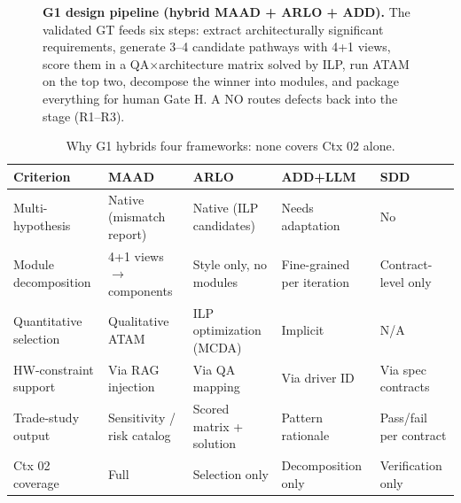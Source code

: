 \documentclass[11pt,a4paper]{article}
\begin{document}
\begin{figure}[htbp]
{}%
\caption{\textbf{G1 design pipeline (hybrid MAAD + ARLO + ADD).} The validated GT feeds
six steps: extract architecturally significant requirements, generate 3--4 candidate
pathways with 4+1 views, score them in a QA$\times$architecture matrix solved by ILP, run
ATAM on the top two, decompose the winner into modules, and package everything for human
Gate H. A NO routes defects back into the stage (R1--R3).}
\label{fig:g1design}
\end{figure}

\begin{table}[htbp]
\centering
\caption{Why G1 hybrids four frameworks: none covers Ctx 02 alone.}
\label{tab:frameworks}
\scriptsize
\setlength{\tabcolsep}{4pt}
\begin{tabular}{@{}lp{3.1cm}p{3.1cm}p{3.1cm}p{3.1cm}@{}}
\toprule
\textbf{Criterion} & \textbf{MAAD} & \textbf{ARLO} & \textbf{ADD+LLM} & \textbf{SDD} \\
\midrule
Multi-hypothesis & Native (mismatch report) & Native (ILP candidates) & Needs adaptation & No \\
Module decomposition & 4+1 views $\to$ components & Style only, no modules & Fine-grained per iteration & Contract-level only \\
Quantitative selection & Qualitative ATAM & ILP optimization (MCDA) & Implicit & N/A \\
HW-constraint support & Via RAG injection & Via QA mapping & Via driver ID & Via spec contracts \\
Trade-study output & Sensitivity / risk catalog & Scored matrix + solution & Pattern rationale & Pass/fail per contract \\
Ctx 02 coverage & Full & Selection only & Decomposition only & Verification only \\
\bottomrule
\end{tabular}
\end{table}
\end{document}
